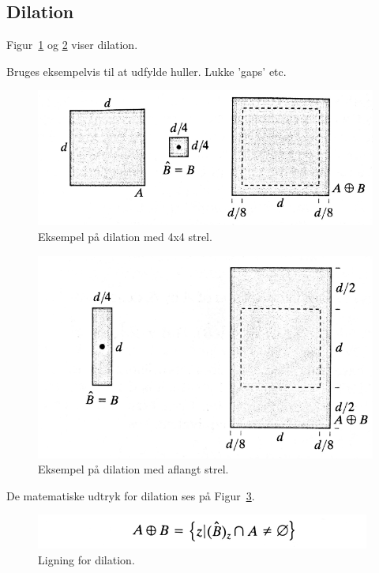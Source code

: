 \subsection{Dilation}
Figur~\ref{fig:dilation1} og \ref{fig:dilation2} viser dilation. 

Bruges eksempelvis til at udfylde huller. Lukke 'gaps' etc.

\begin{figure}[H]
	\centering
	\includegraphics[width=0.7\linewidth]{figs/spm09/dilation1}
	\caption{Eksempel på dilation med 4x4 strel.}
	\label{fig:dilation1}
\end{figure}

\begin{figure}[H]
	\centering
	\includegraphics[width=0.7\linewidth]{figs/spm09/dilation2}
	\caption{Eksempel på dilation med aflangt strel.}
	\label{fig:dilation2}
\end{figure}

De matematiske udtryk for dilation ses på Figur~\ref{fig:dilationeq1}.

\begin{figure}[H]
	\centering
	\includegraphics[width=0.6\linewidth]{figs/spm09/dilationeq1}
	\caption{Ligning for dilation.}
	\label{fig:dilationeq1}
\end{figure}
